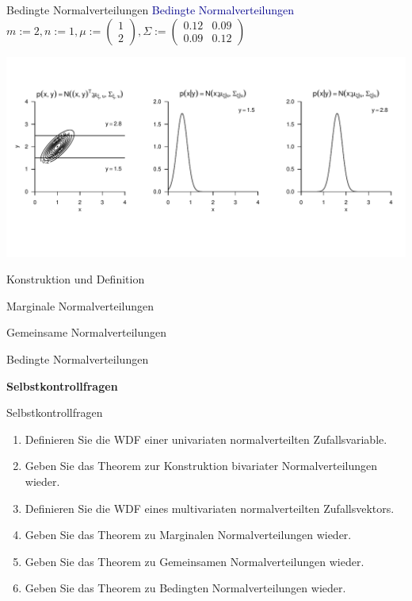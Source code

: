 \documentclass[
  8pt,
  ignorenonframetext,
]{beamer}
\begin{document}
\begin{frame}{Bedingte Normalverteilungen}
\protect\hypertarget{bedingte-normalverteilungen-1}{}
\textcolor{darkblue}{Bedingte Normalverteilungen} \small \center
\(m := 2, n := 1, \mu := \begin{pmatrix} 1 \\ 2 \end{pmatrix}, \Sigma := \begin{pmatrix} 0.12 & 0.09 \\ 0.09 & 0.12 \end{pmatrix}\)

\vspace{-2mm}

\begin{center}\includegraphics[width=1\linewidth]{6_Abbildungen/mvda_6_bedingte_mvnorm} \end{center}
\end{frame}

\begin{frame}{}
\protect\hypertarget{section-7}{}
\large
{}
\vfill

Konstruktion und Definition

Marginale Normalverteilungen

Gemeinsame Normalverteilungen

Bedingte Normalverteilungen

\textbf{Selbstkontrollfragen} \vfill
\end{frame}

\begin{frame}{Selbstkontrollfragen}
\protect\hypertarget{selbstkontrollfragen}{}
\small
\begin{enumerate}
\item Definieren Sie die WDF einer univariaten normalverteilten Zufallsvariable.
\item Geben Sie das Theorem zur Konstruktion bivariater Normalverteilungen wieder.
\item Definieren Sie die WDF eines multivariaten normalverteilten Zufallsvektors.
\item Geben Sie das Theorem zu Marginalen Normalverteilungen wieder.
\item Geben Sie das Theorem zu Gemeinsamen Normalverteilungen wieder.
\item Geben Sie das Theorem zu Bedingten Normalverteilungen wieder.
\end{enumerate}
\end{frame}
\end{document}
